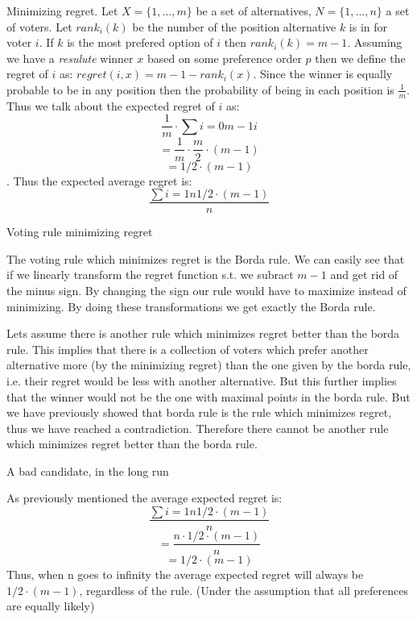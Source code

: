 \documentclass[12pt]{article}
\newenvironment{question}[2][Question]{\begin{trivlist}
\item[\hskip \labelsep {\bfseries #1}\hskip \labelsep {\bfseries #2.}]}{\end{trivlist}}
\newenvironment{answer}[2][Answer]{\begin{trivlist}
\item[\hskip \labelsep {\bfseries #1}\hskip \labelsep {\bfseries #2:}]}{\end{trivlist}}
\begin{document}
\begin{question}{3}

Minimizing regret. Let $X=\{1, ..., m \}$ be a set of alternatives, $N=\{1, ..., n \}$ a set of voters. Let $rank_i(k)$ be the number of the position alternative $k$ is in for voter $i$. If $k$ is the most prefered option of $i$ then $rank_i(k)=m-1$. Assuming we have a \textit{resulute} winner $x$ based on some preference order $p$ then we define the regret of $i$ as: $regret(i,x)=m-1-rank_i(x)$. Since the winner is equally probable to be in any position then the probability of being in each position is $\frac{1}{m}$. Thus we talk about the expected regret of $i$ as:
$$\frac{1}{m}\cdot \sum{i=0}{m-1}{i}$$
$$=\frac{1}{m}\cdot \frac{m}{2}\cdot (m-1)$$
$$=1/2\cdot (m-1)$$.
Thus the expected average regret is:
$$\frac{\sum{i=1}{n}{1/2\cdot (m-1)}}{n}$$
\end{question}
\begin{answer}{a)}{Voting rule minimizing regret}

The voting rule which minimizes regret is the Borda rule. We can easily see that if we linearly transform the regret function s.t. we subract $m-1$ and get rid of the minus sign. By changing the sign our rule would have to maximize instead of minimizing. By doing these transformations we get exactly the Borda rule.

Lets assume there is another rule which minimizes regret better than the borda rule. This implies that there is a collection of voters which prefer another alternative more (by the minimizing regret) than the one given by the borda rule, i.e. their regret would be less with another alternative. But this further implies that the winner would not be the one with maximal points in the borda rule. But we have previously showed that borda rule is the rule which minimizes regret, thus we have reached a contradiction. Therefore there cannot be another rule which minimizes regret better than the borda rule.
\end{answer}
\begin{answer}{b)}{A bad candidate, in the long run}

As previously mentioned the average expected regret is:
$$\frac{\sum{i=1}{n}{1/2\cdot (m-1)}}{n}$$
$$=\frac{n\cdot 1/2 \cdot (m-1)}{n}$$
$$=1/2 \cdot (m-1)$$
Thus, when n goes to infinity the average expected regret will always be $1/2 \cdot (m-1)$, regardless of the rule. (Under the assumption that all preferences are equally likely)
\end{answer}
\end{document}
